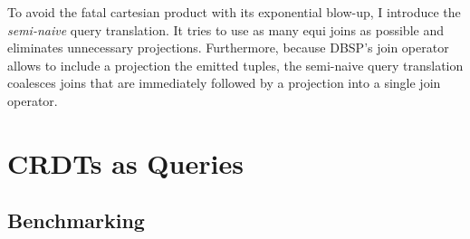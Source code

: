 To avoid the fatal cartesian product with its exponential blow-up,
I introduce the \emph{semi-naive} query translation.
It tries to use as many equi joins as possible and eliminates unnecessary projections.
Furthermore, because DBSP's join operator allows to include a projection the
emitted tuples,
the semi-naive query translation coalesces joins that are immediately followed
by a projection into a single join operator.








\section{\acp{CRDT} as Queries}\label{sec:crdts-as-queries}

\subsection{Benchmarking}\label{sec:benchmarks}
